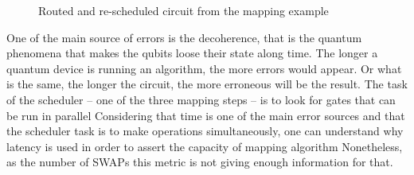 \begin{figure}
    \centering




\label{fig:latency_swaps_ex_map}

\caption{Routed and re-scheduled circuit from the mapping example}
\label{fig:latency_swaps_from_map_ex}
\end{figure}


One of the main source of errors is the decoherence, that is the quantum phenomena that makes the qubits loose their state along time.
The longer a quantum device is running an algorithm, the more errors would appear.
Or what is the same, the longer the circuit, the more erroneous will be the result.
The task of the scheduler -- one of the three mapping steps -- is to look for gates that can be run in parallel
Considering that time is one of the main error sources and that the scheduler task is to make operations simultaneously, one can understand why latency is used in order to assert the capacity of mapping algorithm
Nonetheless, as the number of SWAPs this metric is not giving enough information for that.

